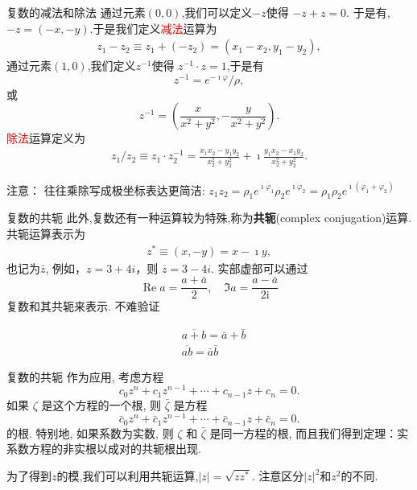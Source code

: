 \documentclass[fontset=windows, chinese, 10pt]{beamer}
\newcommand{\red}[1]{\textcolor{red}{#1}}
\begin{document}
\begin{frame}{复数的减法和除法}
  通过元素$(0,0)$,我们可以定义$-z$使得 $-z + z = 0$. 于是有,$- z = (-x, -y)$.于是我们定义\red{减法}运算为 
\begin{align}
    z_1 - z_2 \equiv z_1 + (-z_2) = (x_1 - x_2, y_1 - y_2) ,
\end{align}
通过元素$(1,0)$,我们定义$z^{-1}$使得
$z^{-1} \cdot z = 1$,于是有 
  $$z^{-1} =e^{-\imath \varphi}/\rho,  $$ 
或
$$z^{-1} = (\frac{x}{x^2 + y^2}, -\frac{y}{x^2 + y^2}). $$ 
\red{ 除法}运算定义为
\begin{align}
    z_1 / z_2 \equiv z_1 \cdot z_2^{-1} = \frac{x_1 x_2 - y_1 y_2} {x_2^2  +  y_2^2 }  + \imath \frac{y_1 x_2 - x_1 y_2} {x_2^2  +  y_2^2 } . 
\end{align}

\begin{alertblock}{注意：}
  { 往往乘除写成极坐标表达更简洁:
      $ z_1 z_2 = \rho_1 e^{\imath \varphi_1 } \rho_2 e^{\imath \varphi_2 } = \rho_1 \rho_2 e^{\imath (\varphi_1 + \varphi_2)} $
  }
\end{alertblock}
\end{frame}



  \begin{frame}{复数的共轭}
    此外,复数还有一种运算较为特殊,称为{\bf 共轭}(complex conjugation)运算.共轭运算表示为
\begin{align}
    z^{*} \equiv (x, -y) = x - \imath y ,
\end{align}
也记为$\bar{z}$, 例如，\( z = 3 + 4i \)，则 \( \overline{z} = 3 - 4i \).
实部虚部可以通过
\begin{equation}
    \operatorname{Re} a=\frac{a+\bar{a}}{2}, \quad \Im a=\frac{a-\bar{a}}{2 \mathrm{i}}
\end{equation}
复数和其共轭来表示. 不难验证

\begin{equation}
    \begin{aligned}
    & \overline{a+b}=\bar{a}+\bar{b} \\
    & \overline{a b}=\bar{a} \bar{b}
    \end{aligned}
\end{equation}

  \end{frame}

  \begin{frame}{复数的共轭}
    作为应用, 考虑方程
$$
c_0 z^n+c_1 z^{n-1}+\cdots+c_{n-1} z+c_n=0 .
$$
如果 $\zeta$ 是这个方程的一个根, 则 $\bar{\zeta}$ 是方程
$$
\bar{c}_0 z^n+\bar{c}_1 z^{n-1}+\cdots+\bar{c}_{n-1} z+\bar{c}_n=0 .
$$
的根. 特别地, 如果系数为实数, 则 $\zeta$ 和 $\bar{\zeta}$ 是同一方程的根, 
而且我们得到定理：实系数方程的非实根以成对的共轭根出现.

为了得到$z$的模,我们可以利用共轭运算,$|z| = \sqrt{zz^{*}}$. 注意区分$|z|^2$和$z^2$的不同.

  \end{frame}
  
\end{document}
